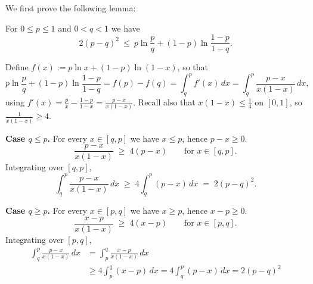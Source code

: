 \documentclass[fontsize=11pt, parskip=half]{scrartcl}
\begin{document}
We first prove the following lemma:

\begin{lemma}\label{lem:pinsker_binary}
    For $0 \leq p \leq 1$ and $0 < q < 1$ we have
    \[
        2(p-q)^2 ~\leq~ p \ln \frac{p}{q} + (1-p) \ln \frac{1-p}{1-q}.
    \]
    \end{lemma}
    
    
    
    
    Define $f(x) := p \ln x + (1-p) \ln (1-x)$, so that
    \[
    p \ln \frac{p}{q} + (1-p) \ln \frac{1-p}{1-q} = f(p) - f(q)
    = \int_q^p f'(x)\, dx
    = \int_q^p \frac{p-x}{x(1-x)}\, dx,
    \]
    using $f'(x) = \frac{p}{x} - \frac{1-p}{1-x} = \frac{p-x}{x(1-x)}$. Recall also that $x(1-x) \leq \tfrac14$ on $[0,1]$, so $\frac{1}{x(1-x)} \geq 4$.
    
    \textbf{Case $q \leq p$.} For every $x \in [q,p]$ we have $x \leq p$, hence $p - x \geq 0$.
    \[
    \frac{p-x}{x(1-x)} \;\geq\; 4(p-x) \qquad \text{for } x \in [q,p].
    \]
    Integrating over $[q,p]$,
    \[
    \int_q^p \frac{p-x}{x(1-x)}\, dx \;\geq\; 4 \int_q^p (p-x)\, dx \;=\; 2(p-q)^2.
    \]
    
    \textbf{Case $q \geq p$.} For every $x \in [p,q]$ we have $x \geq p$, hence $x - p \geq 0$. 
    \[
    \frac{x-p}{x(1-x)} \;\geq\; 4(x-p) \qquad \text{for } x \in [p,q].
    \]
    Integrating over $[p,q]$,
    \begin{align*}
    \int_q^p \frac{p-x}{x(1-x)}\, dx
    &= \int_p^q \frac{x-p}{x(1-x)}\, dx \\
    &\geq 4 \int_p^q (x-p)\, dx
    = 4 \int_q^p (p-x)\, dx
    = 2(p-q)^2
    \end{align*}
\end{document}
